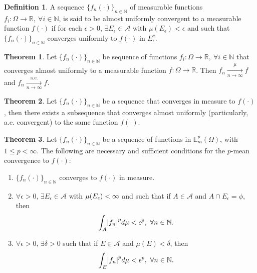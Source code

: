\documentclass[11pt,letterpaper]{article}
\newcommand{\NN}{{\mathbb{N}}}
\newcommand{\LL}{{\mathbb{L}}}
\newcommand{\RR}{{\mathbb{R}}}
\newcommand{\A}{{\mathcal{A}}}
\let\originalleft\left
\let\originalright\right
\renewcommand{\left}{\mathopen{}\mathclose\bgroup\originalleft}
\renewcommand{\right}{\aftergroup\egroup\originalright}
\theoremstyle{definition}
\newtheorem{definition}{Definition}[section]
\newtheorem{theorem}{Theorem}[section]
\begin{document}
\begin{definition}
A sequence $\{f_n(\cdot)\}_{n\in\NN}$ of measurable functions $f_i:\Omega\rightarrow\RR, \ \forall i\in\NN$, is said to be almost uniformly convergent to a measurable function $f(\cdot)$ if for each $\epsilon>0$, $\exists E_\epsilon\in\A$ with $\mu(E_\epsilon)<\epsilon$ and such that $\{f_n(\cdot)\}_{n\in\NN}$ converges uniformly to $f(\cdot)$ in $E_\epsilon^c$.
\end{definition}

\begin{theorem}
Let $\{f_n(\cdot)\}_{n\in\NN}$ be sequence of functions $f_i:\Omega\rightarrow\RR, \ \forall i\in\NN$ that converges almost uniformly to a measurable function $f:\Omega\rightarrow \RR$. Then $f_n\xrightarrow[n\rightarrow\infty]{\mu}f$ and $f_n\xrightarrow[n\rightarrow\infty]{\text{a.e.}}f$.
\end{theorem}

\begin{theorem}
Let $\{f_n(\cdot)\}_{n\in\NN}$ be a sequence that converges in measure to $f(\cdot)$, then there exists a subsequence that converges almost uniformly (particularly, a.e. convergent) to the same function $f(\cdot)$. 
\end{theorem}

\begin{theorem}
Let $\{f_n(\cdot)\}_{n\in\NN}$ be a sequence of functions in $\LL_m^p(\Omega)$, with $1\leq p<\infty$. The following are necessary and sufficient conditions for the $p$-mean convergence to $f(\cdot)$:
\begin{enumerate}
    \item $\{f_n(\cdot)\}_{n\in\NN}$ converges to $f(\cdot)$ in measure.
    \item $\forall \epsilon>0,\,\exists E_\epsilon\in\A$ with $\mu\left(E_\epsilon\right)<\infty$ and such that if $A\in\A$ and $A\cap E_\epsilon=\phi$, then
    \begin{equation}
        \int_A\left|f_n\right|^pd\mu<\epsilon^p, \ \forall n\in\NN.
    \end{equation}
    \item $\forall \epsilon>0,\,\exists\delta>0$ such that if $E\in\A$ and $\mu(E)<\delta$, then
    \begin{equation}
        \int_E\left|f_n\right|^pd\mu<\epsilon^p, \ \forall n\in\NN.
    \end{equation}
\end{enumerate}
\end{theorem}
\end{document}

